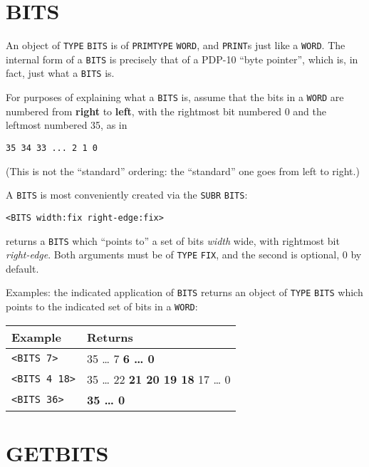 \documentclass[a4paper]{scrbook}
\begin{document}
\section{BITS}\label{bits}

 An object of \texttt{TYPE} \texttt{BITS} is of \texttt{PRIMTYPE} \texttt{WORD}, and
\texttt{PRINT}s just like a \texttt{WORD}. The internal form of a \texttt{BITS} is precisely that of a PDP-10 ``byte
pointer'', which is, in fact, just what a \texttt{BITS} is.

For purposes of explaining what a \texttt{BITS} is, assume that the bits in a \texttt{WORD} are numbered from
\textbf{right} to \textbf{left}, with the rightmost bit numbered 0 and the leftmost numbered 35, as in

\begin{verbatim}
35 34 33 ... 2 1 0
\end{verbatim}

(This is not the ``standard'' ordering: the ``standard'' one goes from left to right.)

A \texttt{BITS} is most conveniently created via the \texttt{SUBR} \texttt{BITS}:

\begin{verbatim}
<BITS width:fix right-edge:fix>
\end{verbatim}

returns a \texttt{BITS} which ``points to'' a set of bits \emph{width} wide, with rightmost bit \emph{right-edge}. Both
arguments must be of \texttt{TYPE} \texttt{FIX}, and the second is optional, 0 by default.

Examples: the indicated application of \texttt{BITS} returns an object of \texttt{TYPE} \texttt{BITS} which points to the
indicated set of bits in a \texttt{WORD}:

\begin{longtable}[]{@{}ll@{}}
\toprule
Example & Returns\tabularnewline
\midrule
\endhead
\texttt{\textless{}BITS\ 7\textgreater{}} & 35 \ldots{} 7 \textbf{6 \ldots{} 0}\tabularnewline
\texttt{\textless{}BITS\ 4\ 18\textgreater{}} & 35 \ldots{} 22 \textbf{21 20 19 18} 17 \ldots{} 0\tabularnewline
\texttt{\textless{}BITS\ 36\textgreater{}} & \textbf{35 \ldots{} 0}\tabularnewline
\bottomrule
\end{longtable}

\section{GETBITS}\label{getbits}
\end{document}
